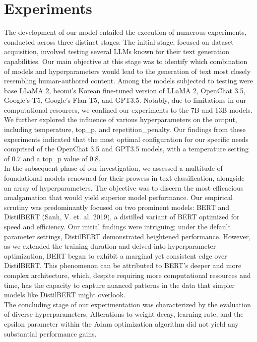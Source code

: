 \documentclass{article}
\begin{document}
\section{Experiments}
\null\quad The development of our model entailed the execution of numerous experiments, conducted across three distinct stages.
The initial stage, focused on dataset acquisition, involved testing several LLMs known for their text generation capabilities.
Our main objective at this stage was to identify which combination of models and hyperparameters would lead to the generation of text most closely resembling human-authored content.
Among the models subjected to testing were base LLaMA 2, beomi's Korean fine-tuned version of LLaMA 2, OpenChat 3.5, Google's T5, Google's Flan-T5, and GPT3.5.
Notably, due to limitations in our computational resources, we confined our experiments to the 7B and 13B models.
We further explored the influence of various hyperparameters on the output, including temperature, top\_p, and repetition\_penalty.
Our findings from these experiments indicated that the most optimal configuration for our specific needs comprised of the OpenChat 3.5 and GPT3.5 models, with a temperature setting of 0.7 and a top\_p value of 0.8. \\
\null\quad In the subsequent phase of our investigation, we assessed a multitude of foundational models renowned for their prowess in text classification, alongside an array of hyperparameters.
The objective was to discern the most efficacious amalgamation that would yield superior model performance.
Our empirical scrutiny was predominantly focused on two prominent models: BERT and DistilBERT (Sanh, V. et. al. 2019), a distilled variant of BERT optimized for speed and efficiency.
Our initial findings were intriguing; under the default parameter settings, DistilBERT demonstrated heightened performance.
However, as we extended the training duration and delved into hyperparameter optimization, BERT began to exhibit a marginal yet consistent edge over DistilBERT.
This phenomenon can be attributed to BERT's deeper and more complex architecture, which, despite requiring more computational resources and time,
has the capacity to capture nuanced patterns in the data that simpler models like DistilBERT might overlook. \\
\null\quad The concluding stage of our experimentation was characterized by the evaluation of diverse hyperparameters.
Alterations to weight decay, learning rate, and the epsilon parameter within the Adam optimization algorithm did not yield any substantial performance gains.
\end{document}
